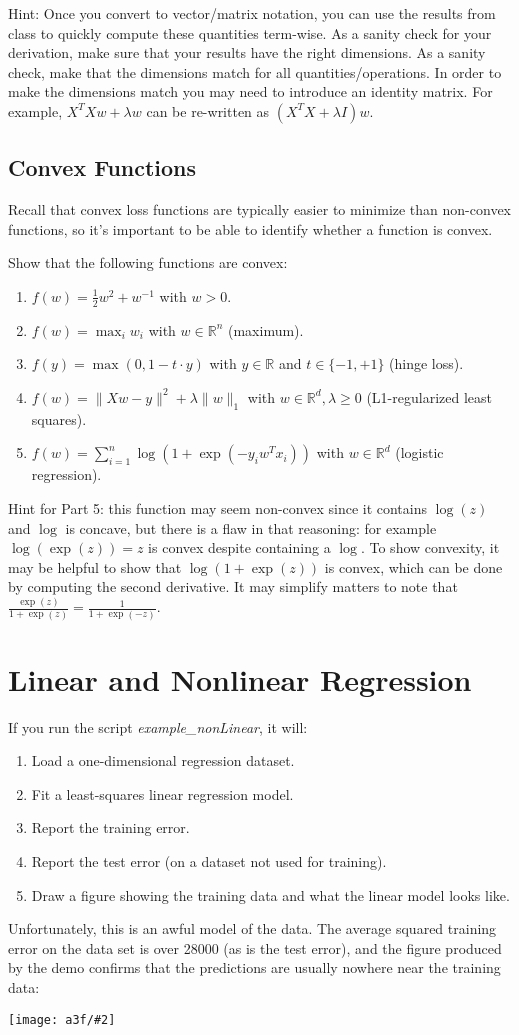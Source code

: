 \documentclass{article}
\def\blu#1{{\color{blu}#1}}
\def\norm#1{\|#1\|}
\def\R{\mathbb{R}}
\def\half{\frac 1 2}
\newcommand{\centerfig}[2]{\begin{center}\texttt{[image: a3f/\#2]}\end{center}}
\def\enum#1{\begin{enumerate}#1\end{enumerate}}
\begin{document}
Hint: Once you convert to vector/matrix notation, you can use the results from class to quickly compute these quantities term-wise.
As a sanity check for your derivation, make sure that your results have the right dimensions. As a sanity check, make that the dimensions match for all quantities/operations. In order to make the dimensions match you may need to introduce an identity matrix. For example, $X^TXw + \lambda w$ can be re-written as $(X^TX + \lambda I)w$.

\pagebreak

\subsection{Convex Functions}

Recall that convex loss functions are typically easier to minimize than non-convex functions, so it's important to be able to identify whether a function is convex.

\blu{Show that the following functions are convex}:

\enum{
\item $f(w) = \half w^2 + w^{-1}$ with $w > 0$.
\item $f(w) = \max_i w_i$ with $w \in \R^n$ (maximum).
\item $f(y) = \max(0,1-t\cdot y)$ with $y\in \R$ and $t\in\{-1,+1\}$ (hinge loss).
\item $f(w) = \norm{Xw-y}^2 + \lambda\norm{w}_1$ with $w \in \R^d, \lambda \geq 0$ (L1-regularized least squares).
\item $f(w) = \sum_{i=1}^n \log(1+\exp(-y_iw^Tx_i)) $ with $w \in \R^d$ (logistic regression).
}

Hint for Part 5:
this function may seem non-convex since it contains $\log(z)$ and $\log$ is concave, but there is a flaw in that reasoning: for example $\log(\exp(z))=z$ is convex despite containing a $\log$. To show convexity, it may be helpful to show that $\log(1+\exp(z))$ is convex, which can be done by computing the second derivative. It may simplify matters to note that $\frac{\exp(z)}{1+\exp(z)} = \frac{1}{1+\exp(-z)}$.

\pagebreak

\section{Linear and Nonlinear Regression}


If you run the script \emph{example\_nonLinear}, it will:
\enum{
\item Load a one-dimensional regression dataset.
\item Fit a least-squares linear regression model.
\item Report the training error.
\item Report the test error (on a dataset not used for training).
\item Draw a figure showing the training data and what the linear model looks like.
}
Unfortunately, this is an awful model of the data. The average squared training error on the data set is over 28000 (as is the test error), and the figure produced by the demo confirms that the predictions are usually nowhere near the training data:
\centerfig{.5}{leastSquares}
\end{document}
